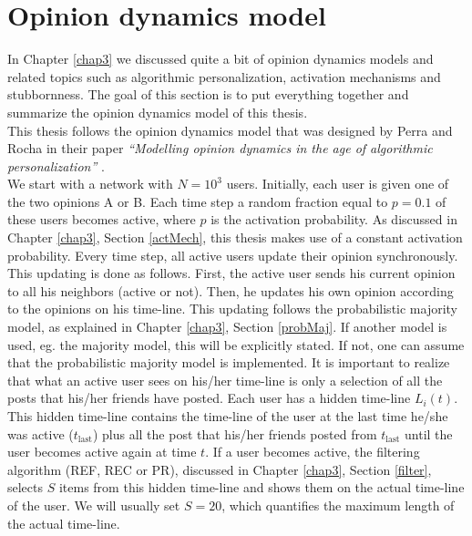 \documentclass[11 pt , letterpaper , twoside , openright]{book}
\begin{document}
 
\section{Opinion dynamics model}\label{opinionmodel}

In Chapter \ref{chap3} we discussed quite a bit of opinion dynamics models and related topics such as algorithmic personalization, activation mechanisms and stubbornness. The goal of this section is to put everything together and summarize the opinion dynamics model of this thesis.\\
\newline
This thesis follows the opinion dynamics model that was designed by Perra and Rocha in their paper \textit{``Modelling opinion dynamics in the age of algorithmic personalization''} \cite{Perra2019}. \\
\newline
We start with a network with $N = 10^3$ users. Initially, each user is given one of the two opinions A or B. Each time step a random fraction equal to $p= 0.1$ of these users becomes active, where $p$ is the activation probability. As discussed in Chapter \ref{chap3}, Section \ref{actMech}, this thesis makes use of a constant activation probability. Every time step, all active users update their opinion synchronously. This updating is done as follows. First, the active user sends his current opinion to all his neighbors (active or not). Then, he updates his own opinion according to the opinions on his time-line. This updating follows the probabilistic majority model, as explained in Chapter \ref{chap3}, Section \ref{probMaj}. If another model is used, eg. the majority model, this will be explicitly stated. If not, one can assume that the probabilistic majority model is implemented. It is important to realize that what an active user sees on his/her time-line is only a selection of all the posts that his/her friends have posted. Each user has a hidden time-line $L_i(t)$. This hidden time-line contains the time-line of the user at the last time he/she was active ($t_{\text{last}}$) plus all the post that his/her friends posted from $t_{\text{last}}$ until the user becomes active again at time $t$. If a user becomes active, the filtering algorithm (REF, REC or PR), discussed in Chapter \ref{chap3}, Section \ref{filter}, selects $S$ items from this hidden time-line and shows them on the actual time-line of the user. We will usually set $S = 20$, which quantifies the maximum length of the actual time-line.\\
\end{document}
